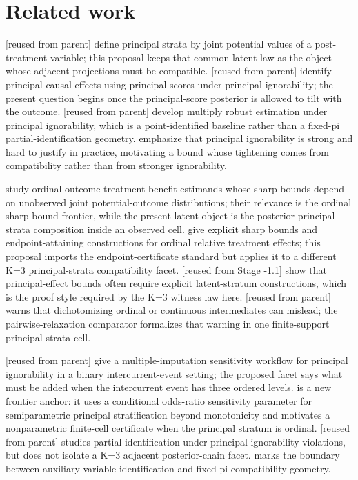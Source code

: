 \documentclass[11pt]{article}
\theoremstyle{definition}
\theoremstyle{plain}
\theoremstyle{remark}
\begin{document}
\section{Related work}
\citet[p.~21]{FrangakisRubin2002} [reused from parent] define principal strata by joint potential values of a post-treatment variable; this proposal keeps that common latent law as the object whose adjacent projections must be compatible.
\citet[Section~2]{DingLu2017} [reused from parent] identify principal causal effects using principal scores under principal ignorability; the present question begins once the principal-score posterior is allowed to tilt with the outcome.
\citet{JiangYangDing2022} [reused from parent] develop multiply robust estimation under principal ignorability, which is a point-identified baseline rather than a fixed-pi partial-identification geometry.
\citet{FellerMealliMiratrix2017} emphasize that principal ignorability is strong and hard to justify in practice, motivating a bound whose tightening comes from compatibility rather than from stronger ignorability.

\citet{LuDingDasgupta2018} study ordinal-outcome treatment-benefit estimands whose sharp bounds depend on unobserved joint potential-outcome distributions; their relevance is the ordinal sharp-bound frontier, while the present latent object is the posterior principal-strata composition inside an observed cell.
\citet[Section~2, Theorem~1]{LuZhangDing2020} give explicit sharp bounds and endpoint-attaining constructions for ordinal relative treatment effects; this proposal imports the endpoint-certificate standard but applies it to a different K=3 principal-strata compatibility facet.
\citet{ZhangRubin2003} [reused from Stage -1.1] show that principal-effect bounds often require explicit latent-stratum constructions, which is the proof style required by the K=3 witness law here.
\citet{VanderWeele2011} [reused from parent] warns that dichotomizing ordinal or continuous intermediates can mislead; the pairwise-relaxation comparator formalizes that warning in one finite-support principal-strata cell.

\citet{WangZhangMealliBornkamp2023} [reused from parent] give a multiple-imputation sensitivity workflow for principal ignorability in a binary intercurrent-event setting; the proposed facet says what must be added when the intercurrent event has three ordered levels.
\citet[Sections~2 and 5]{TongKahanHarhayLi2025} is a new frontier anchor: it uses a conditional odds-ratio sensitivity parameter for semiparametric principal stratification beyond monotonicity and motivates a nonparametric finite-cell certificate when the principal stratum is ordinal.
\citet{WuAntonelli2024} [reused from parent] studies partial identification under principal-ignorability violations, but does not isolate a K=3 adjacent posterior-chain facet.
\citet{JiangDing2021} marks the boundary between auxiliary-variable identification and fixed-pi compatibility geometry.
\end{document}
